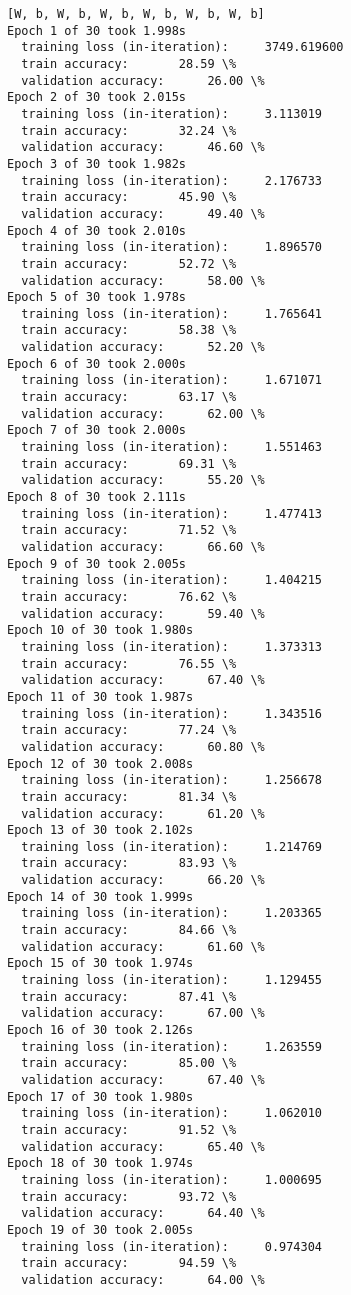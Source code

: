 \documentclass{article}
\begin{document}
    \begin{Verbatim}[commandchars=\\\{\}]
[W, b, W, b, W, b, W, b, W, b, W, b]
Epoch 1 of 30 took 1.998s
  training loss (in-iteration):		3749.619600
  train accuracy:		28.59 \%
  validation accuracy:		26.00 \%
Epoch 2 of 30 took 2.015s
  training loss (in-iteration):		3.113019
  train accuracy:		32.24 \%
  validation accuracy:		46.60 \%
Epoch 3 of 30 took 1.982s
  training loss (in-iteration):		2.176733
  train accuracy:		45.90 \%
  validation accuracy:		49.40 \%
Epoch 4 of 30 took 2.010s
  training loss (in-iteration):		1.896570
  train accuracy:		52.72 \%
  validation accuracy:		58.00 \%
Epoch 5 of 30 took 1.978s
  training loss (in-iteration):		1.765641
  train accuracy:		58.38 \%
  validation accuracy:		52.20 \%
Epoch 6 of 30 took 2.000s
  training loss (in-iteration):		1.671071
  train accuracy:		63.17 \%
  validation accuracy:		62.00 \%
Epoch 7 of 30 took 2.000s
  training loss (in-iteration):		1.551463
  train accuracy:		69.31 \%
  validation accuracy:		55.20 \%
Epoch 8 of 30 took 2.111s
  training loss (in-iteration):		1.477413
  train accuracy:		71.52 \%
  validation accuracy:		66.60 \%
Epoch 9 of 30 took 2.005s
  training loss (in-iteration):		1.404215
  train accuracy:		76.62 \%
  validation accuracy:		59.40 \%
Epoch 10 of 30 took 1.980s
  training loss (in-iteration):		1.373313
  train accuracy:		76.55 \%
  validation accuracy:		67.40 \%
Epoch 11 of 30 took 1.987s
  training loss (in-iteration):		1.343516
  train accuracy:		77.24 \%
  validation accuracy:		60.80 \%
Epoch 12 of 30 took 2.008s
  training loss (in-iteration):		1.256678
  train accuracy:		81.34 \%
  validation accuracy:		61.20 \%
Epoch 13 of 30 took 2.102s
  training loss (in-iteration):		1.214769
  train accuracy:		83.93 \%
  validation accuracy:		66.20 \%
Epoch 14 of 30 took 1.999s
  training loss (in-iteration):		1.203365
  train accuracy:		84.66 \%
  validation accuracy:		61.60 \%
Epoch 15 of 30 took 1.974s
  training loss (in-iteration):		1.129455
  train accuracy:		87.41 \%
  validation accuracy:		67.00 \%
Epoch 16 of 30 took 2.126s
  training loss (in-iteration):		1.263559
  train accuracy:		85.00 \%
  validation accuracy:		67.40 \%
Epoch 17 of 30 took 1.980s
  training loss (in-iteration):		1.062010
  train accuracy:		91.52 \%
  validation accuracy:		65.40 \%
Epoch 18 of 30 took 1.974s
  training loss (in-iteration):		1.000695
  train accuracy:		93.72 \%
  validation accuracy:		64.40 \%
Epoch 19 of 30 took 2.005s
  training loss (in-iteration):		0.974304
  train accuracy:		94.59 \%
  validation accuracy:		64.00 \%

\end{Verbatim}
\end{document}
